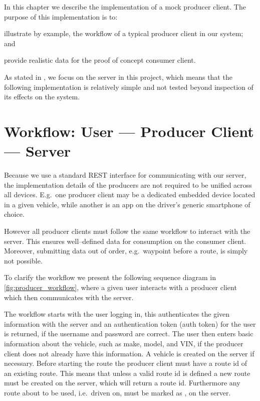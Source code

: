 In this chapter we describe the implementation of a mock producer client.
The purpose of this implementation is to:
\begin{enumberate*}
\item illustrate by example, the workflow of a typical producer client in our system; and
\item provide realistic data for the proof of concept consumer client.
\end{enumberate*}

As stated in , we focus on the server in this project,
which means that the following implementation is relatively simple and not tested beyond inspection of its effects on the system.

\section{Workflow: User --- Producer Client --- Server}
Because we use a standard REST interface for communicating with our server, the implementation details of the producers are not required to be unified across all devices.
E.g.~one producer client may be a dedicated embedded device located in a given vehicle, while another is an app on the driver's generic smartphone of choice.

However all producer clients must follow the same workflow to interact with the server.
This ensures well--defined data for consumption on the consumer client. %
Moreover, submitting data out of order, e.g.~waypoint before a route, is simply not possible.

\bigskip
To clarify the workflow we present the following sequence diagram in \cref{fig:producer_workflow},
where a given user interacts with a producer client which then communicates with the server.

The workflow starts with the user logging in, this authenticates the given information with the server and an authentication token (auth token) for the user is returned, if the username and password are correct.
The user then enters basic information about the vehicle, such as make, model, and VIN, if the producer client does not already have this information.
A vehicle is created on the server if necessary.
Before starting the route the producer client must have a route id of an existing route.
This means that unless a valid route id is defined a new route must be created on the server, which will return a route id.
Furthermore any route about to be used, i.e.~driven on, must be marked as , on the server.

